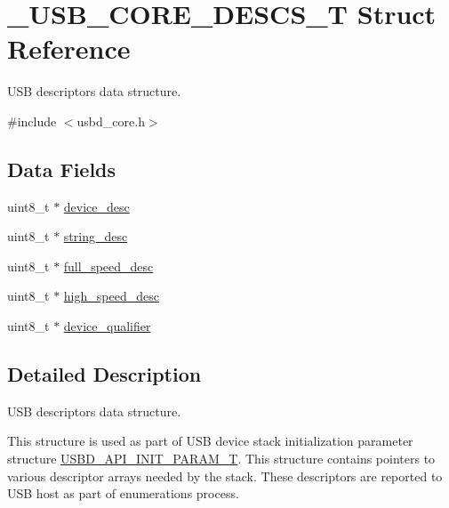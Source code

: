 \hypertarget{struct__USB__CORE__DESCS__T}{\section{\-\_\-\-U\-S\-B\-\_\-\-C\-O\-R\-E\-\_\-\-D\-E\-S\-C\-S\-\_\-\-T Struct Reference}
\label{struct__USB__CORE__DESCS__T}
}


U\-S\-B descriptors data structure.  




{\ttfamily \#include $<$usbd\-\_\-core.\-h$>$}

\subsection*{Data Fields}
\begin{DoxyCompactItemize}
\item 
uint8\-\_\-t $\ast$ \hyperlink{struct__USB__CORE__DESCS__T_a15c6d25f9b77c7034439715d769f20f3}{device\-\_\-desc}
\item 
uint8\-\_\-t $\ast$ \hyperlink{struct__USB__CORE__DESCS__T_af785297629e79dec58480668d005c04e}{string\-\_\-desc}
\item 
uint8\-\_\-t $\ast$ \hyperlink{struct__USB__CORE__DESCS__T_adc04768aaa60355fd9934895955b7439}{full\-\_\-speed\-\_\-desc}
\item 
uint8\-\_\-t $\ast$ \hyperlink{struct__USB__CORE__DESCS__T_a99f740c42483df30cc2924383c8a4d2b}{high\-\_\-speed\-\_\-desc}
\item 
uint8\-\_\-t $\ast$ \hyperlink{struct__USB__CORE__DESCS__T_aec1cd64157ed8c38c31b561f6857e6cf}{device\-\_\-qualifier}
\end{DoxyCompactItemize}


\subsection{Detailed Description}
U\-S\-B descriptors data structure. 

This structure is used as part of U\-S\-B device stack initialization parameter structure \hyperlink{group__USBD__Core_gaa6e8171941c1ae63afed95974e0f18e3}{U\-S\-B\-D\-\_\-\-A\-P\-I\-\_\-\-I\-N\-I\-T\-\_\-\-P\-A\-R\-A\-M\-\_\-\-T}. This structure contains pointers to various descriptor arrays needed by the stack. These descriptors are reported to U\-S\-B host as part of enumerations process.

